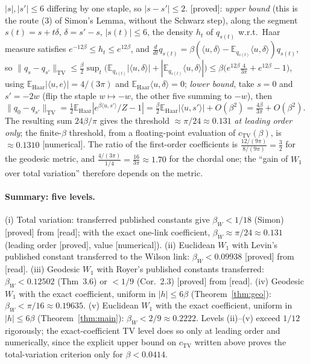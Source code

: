 \documentclass[11pt,a4paper]{article}
\theoremstyle{remark}
\theoremstyle{definition}
\newcommand{\E}{\mathbb{E}}
\newcommand{\st}[1]{\textsf{[#1]}}
\begin{document}
$|s|,|s'|\le6$ differing by one staple, so $|s-s'|\le2$. \st{proved}: \emph{upper bound} (this is the route
(3) of Simon's Lemma, without the Schwarz step), along the segment
$s(t)=s+t\delta$, $\delta=s'-s$, $|s(t)|\le6$, the density $h_t$ of $q_{s(t)}$ w.r.t.\ Haar measure satisfies
$e^{-12\beta}\le h_t\le e^{12\beta}$, and $\frac{d}{dt}q_{s(t)}=\beta(\langle u,\delta\rangle-\E_{q_{s(t)}}\langle u,\delta\rangle)q_{s(t)}$,
so $\|q_s-q_{s'}\|_{\mathrm{TV}}\le\frac\beta2\sup_t\big(\E_{q_{s(t)}}|\langle u,\delta\rangle|+|\E_{q_{s(t)}}\langle u,\delta\rangle|\big)
\le\beta\big(e^{12\beta}\tfrac{4}{3\pi}+e^{12\beta}-1\big)$, using $\E_{\mathrm{Haar}}|\langle u,e\rangle|=4/(3\pi)$ and
$\E_{\mathrm{Haar}}\langle u,\delta\rangle=0$; \emph{lower bound}, take $s=0$ and $s'=-2w$ (flip the staple
$w\mapsto-w$, the other five summing to $-w$), then $\|q_0-q_{s'}\|_{\mathrm{TV}}=\frac12\E_{\mathrm{Haar}}|e^{\beta\langle u,s'\rangle}/Z-1|
=\frac\beta2\E_{\mathrm{Haar}}|\langle u,s'\rangle|+O(\beta^2)=\frac{4\beta}{3\pi}+O(\beta^2)$. The resulting sum
$24\beta/\pi$ gives the threshold $\approx\pi/24\approx0.131$ \emph{at leading order only}; the finite-$\beta$
threshold, from a floating-point evaluation of $c_{\mathrm{TV}}(\beta)$, is $\approx0.1310$ \st{numerical}.
The ratio of the first-order coefficients is $\frac{12/(9\pi)}{8/(9\pi)}=\frac32$ for the geodesic metric, and
$\frac{4/(3\pi)}{1/4}=\frac{16}{3\pi}\approx1.70$ for the chordal one; the ``gain of $W_1$ over total variation''
therefore depends on the metric.

\paragraph{Summary: five levels.} (i) Total variation: transferred published constants give $\beta_W<1/18$
(Simon) \st{proved} from \st{read}; with the exact one-link coefficient, $\beta_W\approx\pi/24\approx0.131$
(leading order \st{proved}, value \st{numerical}). (ii) Euclidean $W_1$ with Levin's published constant
transferred to the Wilson link: $\beta_W<0.09938$ \st{proved} from \st{read}. (iii) Geodesic $W_1$ with Royer's
published constants transferred: $\beta_W<0.12502$ (Thm~3.6) or $<1/9$ (Cor.~2.3) \st{proved} from \st{read}.
(iv) Geodesic $W_1$ with the exact coefficient, uniform in $|h|\le6\beta$ (Theorem~\ref{thm:geo}):
$\beta_W<\pi/16\approx0.19635$. (v) Euclidean $W_1$ with the exact coefficient, uniform in $|h|\le6\beta$
(Theorem~\ref{thm:main}): $\beta_W<2/9\approx0.2222$. Levels (ii)--(v) exceed $1/12$ rigorously; the
exact-coefficient TV level does so only at leading order and numerically, since the explicit upper bound on
$c_{\mathrm{TV}}$ written above proves the total-variation criterion only for $\beta<0.0414$.
\end{document}
